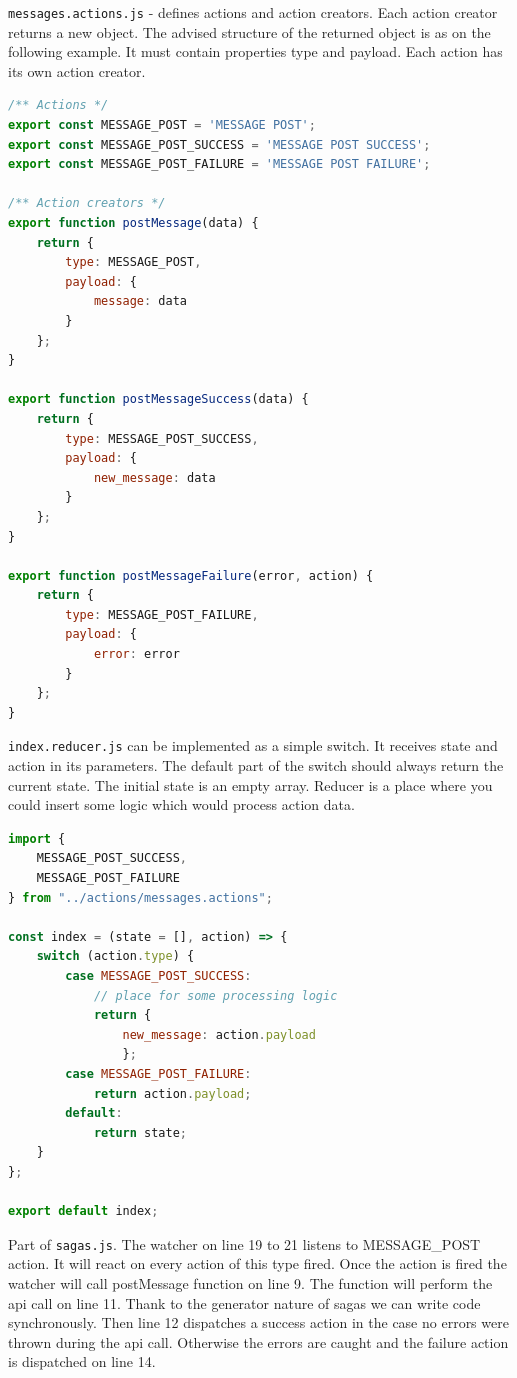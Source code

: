 \documentclass[thesis=M,english]{FITthesis}[2012/10/20]
\begin{document}
\verb|messages.actions.js| - defines actions and action creators. Each action creator returns a new object. The advised structure of the returned object is as on the following example. It must contain properties type and payload. Each action has its own action creator. 

\begin{lstlisting}[language=JavaScript]
/** Actions */
export const MESSAGE_POST = 'MESSAGE POST';
export const MESSAGE_POST_SUCCESS = 'MESSAGE POST SUCCESS';
export const MESSAGE_POST_FAILURE = 'MESSAGE POST FAILURE';

/** Action creators */
export function postMessage(data) {
    return {
        type: MESSAGE_POST,
        payload: {
            message: data        
        }
    };
}

export function postMessageSuccess(data) {
    return {
        type: MESSAGE_POST_SUCCESS,
        payload: {
            new_message: data
        }
    };
}

export function postMessageFailure(error, action) {
    return {
        type: MESSAGE_POST_FAILURE,
        payload: {
            error: error
        }
    };
}

\end{lstlisting}

\verb|index.reducer.js| can be implemented as a simple switch. It receives state and action in its parameters. The default part of the switch should always return the current state. The initial state is an empty array. Reducer is a place where you could insert some logic which would process action data. 
\begin{lstlisting}[language=JavaScript]
import {
    MESSAGE_POST_SUCCESS,
    MESSAGE_POST_FAILURE
} from "../actions/messages.actions";

const index = (state = [], action) => {
    switch (action.type) {
        case MESSAGE_POST_SUCCESS:
            // place for some processing logic
            return { 
            	new_message: action.payload
				};
        case MESSAGE_POST_FAILURE:
            return action.payload;
        default:
            return state;
    }
};

export default index;
\end{lstlisting}

Part of \verb|sagas.js|. The watcher on line 19 to 21 listens to MESSAGE\_POST action. It will react on every action of this type fired. Once the action is fired the watcher will call postMessage function on line 9. The function will perform the api call on line 11. Thank to the generator nature of sagas we can write code synchronously. Then line 12 dispatches a success action in the case no errors were thrown during the api call. Otherwise the errors are caught and the failure action is dispatched on line 14.
\end{document}
